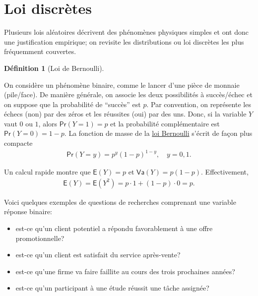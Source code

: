 \documentclass[
  11pt,
  letterpaper,
]{scrbook}
\providecommand{\tightlist}{%
  \setlength{\itemsep}{0pt}\setlength{\parskip}{0pt}}\usepackage{longtable,booktabs,array}
\theoremstyle{definition}
\newtheorem{definition}{Définition}[chapter]
\theoremstyle{definition}
\theoremstyle{remark}
\begin{document}
\section{Loi discrètes}\label{loi-discruxe8tes}

Plusieurs lois aléatoires décrivent des phénomènes physiques simples et
ont donc une justification empirique; on revisite les distributions ou
loi discrètes les plus fréquemment couvertes.

\begin{definition}[Loi de
Bernoulli]\protect\hypertarget{def-loibern}{}\label{def-loibern}

On considère un phénomène binaire, comme le lancer d'une pièce de
monnaie (pile/face). De manière générale, on associe les deux
possibilités à succès/échec et on suppose que la probabilité de
``succès'' est \(p\). Par convention, on représente les échecs (non) par
des zéros et les réussites (oui) par des uns. Donc, si la variable \(Y\)
vaut \(0\) ou \(1\), alors \(\mathsf{Pr}(Y=1)=p\) et la probabilité
complémentaire est \(\mathsf{Pr}(Y=0)=1-p\). La fonction de masse de la
\href{https://fr.wikipedia.org/wiki/Loi_de_Bernoulli}{loi Bernoulli}
s'écrit de façon plus compacte \begin{align*}
\mathsf{Pr}(Y=y) = p^y (1-p)^{1-y}, \quad y=0, 1.
\end{align*}

\end{definition}

Un calcul rapide montre que \(\mathsf{E}(Y)=p\) et
\(\mathsf{Va}(Y)=p(1-p)\). Effectivement, \begin{align*}
\mathsf{E}(Y) = \mathsf{E}(Y^2) = p \cdot 1 + (1-p) \cdot 0 = p.
\end{align*}

Voici quelques exemples de questions de recherches comprenant une
variable réponse binaire:

\begin{itemize}
\tightlist
\item
  est-ce qu'un client potentiel a répondu favorablement à une offre
  promotionnelle?
\item
  est-ce qu'un client est satisfait du service après-vente?
\item
  est-ce qu'une firme va faire faillite au cours des trois prochaines
  années?
\item
  est-ce qu'un participant à une étude réussit une tâche assignée?
\end{itemize}
\end{document}
